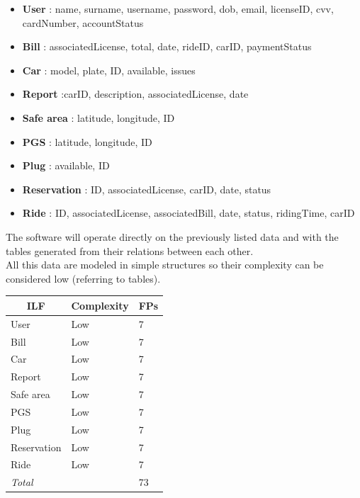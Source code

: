 \documentclass[english]{article}
\begin{document}
\begin{itemize}

	\item \textbf{User} : name, surname, username, password, dob, email, licenseID, cvv, cardNumber, accountStatus

	\item \textbf{Bill} : associatedLicense, total, date, rideID, carID, paymentStatus

	\item \textbf{Car} : model, plate, ID, available, issues

	\item \textbf{Report} :carID, description, associatedLicense, date

	\item \textbf{Safe area} : latitude, longitude, ID

	\item \textbf{PGS} : latitude, longitude, ID

	\item \textbf{Plug} : available, ID

	\item \textbf{Reservation} : ID, associatedLicense, carID, date, status

	\item \textbf{Ride} : ID, associatedLicense, associatedBill, date, status, ridingTime, carID

\end{itemize}

The software will operate directly on the previously listed data and with the tables generated from their relations between each other.\\
All this data are modeled in simple structures so their complexity can be considered low (referring to tables).

\begin{center}
	\begin{tabular}{ |p{8cm}|m{2cm}|p{1cm}| }
		\hline
		\multicolumn{1}{|c|}{\textbf{ILF}} & \multicolumn{1}{c|}{\textbf{Complexity}} & \multicolumn{1}{c|}{\textbf{FPs}} \\
		\hline
		User & Low & 7 \\
		\hline
		Bill & Low & 7\\
		\hline
		Car & Low & 7\\
		\hline
		Report & Low & 7\\
		\hline
		Safe area & Low & 7\\
		\hline
		PGS & Low & 7\\
		\hline
		Plug & Low & 7\\
		\hline
		Reservation & Low & 7\\
		\hline
		Ride & Low & 7\\
		\hline
		\multicolumn{2}{|l|}{\textit{Total}} & \multicolumn{1}{l|}{73} \\
		\hline
	\end{tabular}
\end{center}
\end{document}
